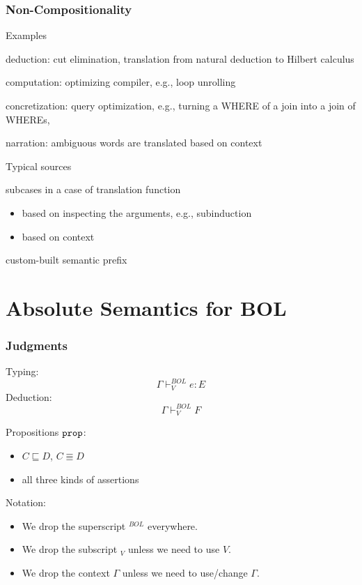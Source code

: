 \begin{frame}\frametitle{Non-Compositionality}
\begin{blockitems}{Examples}
 \item deduction: cut elimination, translation from natural deduction to Hilbert calculus
 \item computation: optimizing compiler, e.g., loop unrolling
 \item concretization: query optimization, e.g., turning a WHERE of a join into a join of WHEREs,
 \item narration: ambiguous words are translated based on context
\end{blockitems}

\begin{blockitems}{Typical sources}
 \item subcases in a case of translation function
  \begin{itemize}
  \item based on inspecting the arguments, e.g., subinduction
  \item based on context
  \end{itemize}
 \item custom-built semantic prefix
\end{blockitems}
\end{frame}

\section{Absolute Semantics for BOL}

\begin{frame}\frametitle{Judgments}
Typing:  \[\Gamma\vdash^{BOL}_V e:E\]
Deduction: \[\Gamma\vdash^{BOL}_V F\]

Propositions $\prop$:
\begin{itemize}
\item $C\sqsubseteq D$, $C\Equiv D$
\item all three kinds of assertions
\end{itemize}

Notation:
\begin{itemize}
\item We drop the superscript $^{BOL}$ everywhere.
\item We drop the subscript $_V$ unless we need to use $V$.
\item We drop the context $\Gamma$ unless we need to use/change $\Gamma$.
\end{itemize}
\end{frame}

